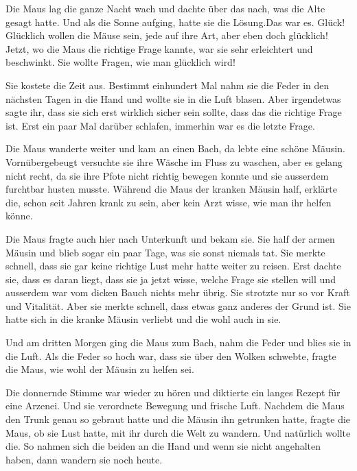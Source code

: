 Die Maus lag die ganze Nacht wach und dachte über das nach, was die Alte gesagt hatte. Und als die Sonne aufging, hatte sie die Lösung.Das war es. Glück! Glücklich wollen die Mäuse sein, jede auf ihre Art, aber eben doch glücklich! Jetzt, wo die Maus die richtige Frage kannte, war sie sehr erleichtert und beschwinkt. Sie wollte Fragen, wie man glücklich wird! 

Sie kostete die Zeit aus. Bestimmt einhundert Mal nahm sie die Feder in den nächsten Tagen in die Hand und wollte sie in die Luft blasen. Aber irgendetwas sagte ihr, dass sie sich erst wirklich sicher sein sollte, dass das die richtige Frage ist. Erst ein paar Mal darüber schlafen, immerhin war es die letzte Frage.

Die Maus wanderte weiter und kam an einen Bach, da lebte eine schöne Mäusin. Vornübergebeugt versuchte sie ihre Wäsche im Fluss zu waschen, aber es gelang nicht recht, da sie ihre Pfote nicht richtig bewegen konnte und sie ausserdem furchtbar husten musste. Während die Maus der kranken Mäusin half, erklärte die, schon seit Jahren krank zu sein, aber kein Arzt wisse, wie man ihr helfen könne.

Die Maus fragte auch hier nach Unterkunft und bekam sie. Sie half der armen Mäusin und blieb sogar ein paar Tage, was sie sonst niemals tat. Sie merkte schnell, dass sie gar keine richtige Lust mehr hatte weiter zu reisen. Erst dachte sie, dass es daran liegt, dass sie ja jetzt wisse, welche Frage sie stellen will und ausserdem war vom dicken Bauch nichts mehr übrig. Sie strotzte nur so vor Kraft und Vitalität. Aber sie merkte schnell, dass etwas ganz anderes der Grund ist. Sie hatte sich in die kranke Mäusin verliebt und die wohl auch in sie.

Und am dritten Morgen ging die Maus zum Bach, nahm die Feder und blies sie in die Luft. Als die Feder so hoch war, dass sie über den Wolken schwebte, fragte die Maus, wie wohl der Mäusin zu helfen sei.

Die donnernde Stimme war wieder zu hören und diktierte ein langes Rezept für eine Arzenei. Und sie verordnete Bewegung und frische Luft. Nachdem die Maus den Trunk genau so gebraut hatte und die Mäusin ihn getrunken hatte, fragte die Maus, ob sie Lust hatte, mit ihr durch die Welt zu wandern. Und natürlich wollte die. So nahmen sich die beiden an die Hand und wenn sie nicht angehalten haben, dann wandern sie noch heute.

